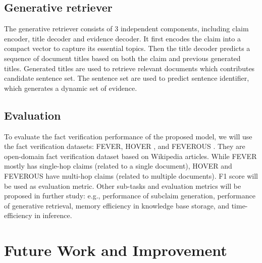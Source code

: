 \documentclass{article}
\begin{document}
\subsection{Generative retriever}
The generative retriever consists of 3 independent components, including claim encoder, title decoder and evidence decoder. It first encodes the claim into a compact vector to capture its essential topics. Then the title decoder predicts a sequence of document titles based on both the claim and previous generated titles. Generated titles are used to retrieve relevant documents which contributes candidate sentence set. The sentence set are used to predict sentence identifier, which generates a dynamic set of evidence.

\subsection{Evaluation}
To evaluate the fact verification performance of the proposed model, we will use the fact verification datasets: FEVER, HOVER \cite{jiang2020hover}, and FEVEROUS \cite{aly2021feverous}. They are open-domain fact verification dataset based on Wikipedia articles. While FEVER mostly has single-hop claims (related to a single document), HOVER and FEVEROUS have multi-hop claims (related to multiple documents). F1 score will be used as evaluation metric.
Other sub-tasks and evaluation metrics will be proposed in further study: e.g., performance of subclaim generation, performance of generative retrieval, memory efficiency in knowledge base storage, and time-efficiency in inference.


\section{Future Work and Improvement}
\end{document}
